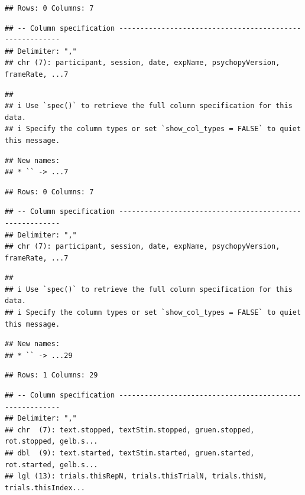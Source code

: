 \documentclass[
]{book}
\begin{document}
\begin{verbatim}
## Rows: 0 Columns: 7
\end{verbatim}

\begin{verbatim}
## -- Column specification --------------------------------------------------------
## Delimiter: ","
## chr (7): participant, session, date, expName, psychopyVersion, frameRate, ...7
\end{verbatim}

\begin{verbatim}
## 
## i Use `spec()` to retrieve the full column specification for this data.
## i Specify the column types or set `show_col_types = FALSE` to quiet this message.
\end{verbatim}

\begin{verbatim}
## New names:
## * `` -> ...7
\end{verbatim}

\begin{verbatim}
## Rows: 0 Columns: 7
\end{verbatim}

\begin{verbatim}
## -- Column specification --------------------------------------------------------
## Delimiter: ","
## chr (7): participant, session, date, expName, psychopyVersion, frameRate, ...7
\end{verbatim}

\begin{verbatim}
## 
## i Use `spec()` to retrieve the full column specification for this data.
## i Specify the column types or set `show_col_types = FALSE` to quiet this message.
\end{verbatim}

\begin{verbatim}
## New names:
## * `` -> ...29
\end{verbatim}

\begin{verbatim}
## Rows: 1 Columns: 29
\end{verbatim}

\begin{verbatim}
## -- Column specification --------------------------------------------------------
## Delimiter: ","
## chr  (7): text.stopped, textStim.stopped, gruen.stopped, rot.stopped, gelb.s...
## dbl  (9): text.started, textStim.started, gruen.started, rot.started, gelb.s...
## lgl (13): trials.thisRepN, trials.thisTrialN, trials.thisN, trials.thisIndex...
\end{verbatim}
\end{document}
